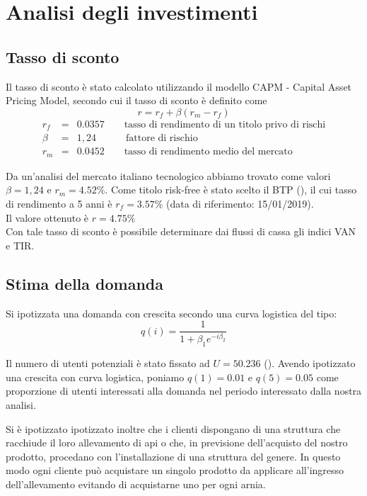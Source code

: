 \section{Analisi degli investimenti}
\subsection{Tasso di sconto}
Il tasso di sconto è stato calcolato utilizzando il modello CAPM - Capital Asset
Pricing Model, secondo cui il tasso di sconto è definito come
\begin{displaymath}
r = r_f + \beta (r_m - r_f )
\end{displaymath}
\begin{eqnarray*}
r_f &=& 0.0357 \qquad \mbox{tasso di rendimento di un titolo privo di rischi} \\ 
\beta &=& 1,24 \quad\qquad \mbox{fattore di rischio} \\
r_m &=& 0.0452 \qquad \mbox{tasso di rendimento medio del mercato}
\end{eqnarray*}

Da un’analisi del mercato italiano tecnologico abbiamo trovato come valori
$\beta=1,24$ e $r_m=4.52\%$. Come titolo risk-free è stato scelto il BTP
(\cite{finmer}), il cui tasso di rendimento a 5 anni è $r_f=3.57\%$ (data di
riferimento: 15/01/2019).\\ 
Il valore ottenuto è $r = 4.75\%$\\
Con tale tasso di sconto è possibile determinare dai flussi di cassa gli indici
VAN e TIR.
%
%
\subsection{Stima della domanda}
Si ipotizzata una domanda con crescita secondo una curva logistica del tipo: 
\begin{displaymath}
q(i) = \frac{1}{1 + \beta_1 e^{-i\beta_2}}
\end{displaymath}

Il numero di utenti potenziali è stato fissato ad $U=50.236$ (\cite{miele}).
Avendo ipotizzato una crescita con curva logistica, poniamo $q(1)=0.01$ e
$q(5)=0.05$ come proporzione di utenti interessati alla domanda nel periodo
interessato dalla nostra analisi.  

Si è ipotizzato ipotizzato inoltre che i clienti dispongano di una struttura che
racchiude il loro allevamento di api o che, in previsione dell’acquisto del
nostro prodotto, procedano con l’installazione di una struttura del genere. In
questo modo ogni cliente può acquistare un singolo prodotto da applicare
all’ingresso dell’allevamento evitando di acquistarne uno per ogni arnia.


